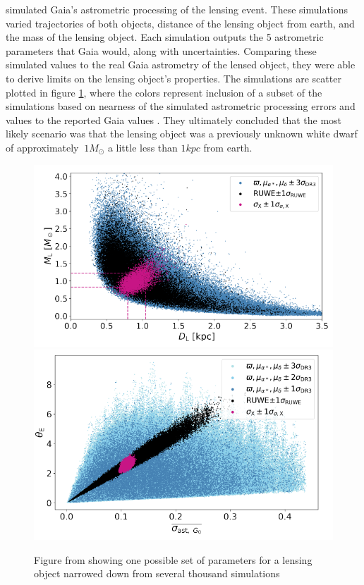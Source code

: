 \documentclass[preprint2]{aastex631}
\begin{document}
\cite{jablonskaThere2022} simulated Gaia's astrometric processing of the lensing event. These simulations varied trajectories of both objects, distance of the lensing object from earth, and the mass of the lensing object. Each simulation outputs the 5 astrometric parameters that Gaia would, along with uncertainties. Comparing these simulated values to the real Gaia astrometry of the lensed object, they were able to derive limits on the lensing object's properties. The simulations are scatter plotted in figure \ref{fig:simulation}, where the colors represent inclusion of a subset of the simulations based on nearness of the simulated astrometric processing errors and values to the reported Gaia values \citep{jablonskaThere2022}. They ultimately concluded that the most likely scenario was that the lensing object was a previously unknown white dwarf of approximately $~1 M_\odot$ a little less than $1 kpc$ from earth.

\begin{figure}
	\includegraphics[width=\columnwidth]{microlensingsimMD.png}
	\includegraphics[width=\columnwidth]{microlensingsimTheta.png}
	\caption{Figure from \cite{jablonskaThere2022} showing one possible set of parameters for a lensing object narrowed down from several thousand simulations}
	\label{fig:simulation}
\end{figure}
\end{document}

